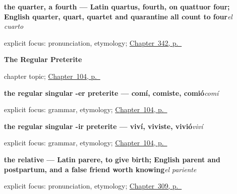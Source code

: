 \noindent\begin{minipage}[t]{\linewidth}
\raggedright
\textbf{the quarter, a fourth — Latin quartus, fourth, on quattuor four; English quarter, quart, quartet and quarantine all count to four}\enspace\emph{el cuarto}\par
\footnotesize explicit focus: pronunciation, etymology; \hyperref[ch:el-minuto-y-el-cuarto]{Chapter~342, p.~\pageref*{ch:el-minuto-y-el-cuarto}}
\end{minipage}\par\smallskip

\noindent\begin{minipage}[t]{\linewidth}
\raggedright
\textbf{The Regular Preterite}\par
\footnotesize chapter topic; \hyperref[ch:spanish-preterito-regular]{Chapter~104, p.~\pageref*{ch:spanish-preterito-regular}}
\end{minipage}\par\smallskip

\noindent\begin{minipage}[t]{\linewidth}
\raggedright
\textbf{the regular singular -er preterite — comí, comiste, comió}\enspace\emph{comí}\par
\footnotesize explicit focus: grammar, etymology; \hyperref[ch:spanish-preterito-regular]{Chapter~104, p.~\pageref*{ch:spanish-preterito-regular}}
\end{minipage}\par\smallskip

\noindent\begin{minipage}[t]{\linewidth}
\raggedright
\textbf{the regular singular -ir preterite — viví, viviste, vivió}\enspace\emph{viví}\par
\footnotesize explicit focus: grammar, etymology; \hyperref[ch:spanish-preterito-regular]{Chapter~104, p.~\pageref*{ch:spanish-preterito-regular}}
\end{minipage}\par\smallskip

\noindent\begin{minipage}[t]{\linewidth}
\raggedright
\textbf{the relative --- Latin parere, to give birth; English parent and postpartum, and a false friend worth knowing}\enspace\emph{el pariente}\par
\footnotesize explicit focus: pronunciation, etymology; \hyperref[ch:familia-y-pareja]{Chapter~309, p.~\pageref*{ch:familia-y-pareja}}
\end{minipage}\par\smallskip

